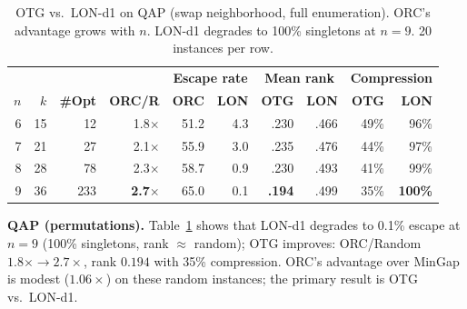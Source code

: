 \documentclass[runningheads]{llncs}
\begin{document}
\begin{table}[t]
\caption{OTG vs.\ LON-d1 on QAP (swap neighborhood, full enumeration). ORC's advantage grows with $n$. LON-d1 degrades to 100\% singletons at $n\!=\!9$. 20 instances per row.}
\label{tab:qap}
\centering
\small
\begin{tabular}{@{}rrrr|rr|rr|rr@{}}
\toprule
& & & & \multicolumn{2}{c|}{\textbf{Escape rate}} & \multicolumn{2}{c|}{\textbf{Mean rank}} & \multicolumn{2}{c}{\textbf{Compression}} \\
$n$ & $k$ & \textbf{\#Opt} & \textbf{ORC/R} & \textbf{ORC} & \textbf{LON} & \textbf{OTG} & \textbf{LON} & \textbf{OTG} & \textbf{LON} \\
\midrule
6  & 15 &   12 & 1.8$\times$ & 51.2 &  4.3 & .230 & .466 & 49\% & 96\% \\
7  & 21 &   27 & 2.1$\times$ & 55.9 &  3.0 & .235 & .476 & 44\% & 97\% \\
8  & 28 &   78 & 2.3$\times$ & 58.7 &  0.9 & .230 & .493 & 41\% & 99\% \\
9  & 36 &  233 & \textbf{2.7$\times$} & 65.0 &  0.1 & \textbf{.194} & .499 & 35\% & \textbf{100\%} \\
\bottomrule
\end{tabular}
\end{table}

\textbf{QAP (permutations).}
Table~\ref{tab:qap} shows that LON-d1 degrades to 0.1\% escape at $n\!=\!9$ (100\% singletons, rank $\approx$ random); OTG improves: ORC/Random $1.8\times \to 2.7\times$, rank $0.194$ with 35\% compression.
ORC's advantage over MinGap is modest ($1.06\times$) on these random instances; the primary result is OTG vs.\ LON-d1.
\end{document}
